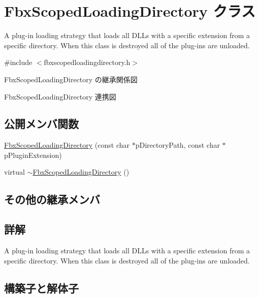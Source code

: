 \hypertarget{class_fbx_scoped_loading_directory}{}\section{Fbx\+Scoped\+Loading\+Directory クラス}
\label{class_fbx_scoped_loading_directory}


A plug-\/in loading strategy that loads all D\+L\+Ls with a specific extension from a specific directory. When this class is destroyed all of the plug-\/ins are unloaded.  




{\ttfamily \#include $<$fbxscopedloadingdirectory.\+h$>$}



Fbx\+Scoped\+Loading\+Directory の継承関係図


Fbx\+Scoped\+Loading\+Directory 連携図
\subsection*{公開メンバ関数}
\begin{DoxyCompactItemize}
\item 
\hyperlink{class_fbx_scoped_loading_directory_a9679c872ae08e0a76f9b63a7dc899985}{Fbx\+Scoped\+Loading\+Directory} (const char $\ast$p\+Directory\+Path, const char $\ast$p\+Plugin\+Extension)
\item 
virtual \hyperlink{class_fbx_scoped_loading_directory_ae8a3e3331bf58edef910021442af358b}{$\sim$\+Fbx\+Scoped\+Loading\+Directory} ()
\end{DoxyCompactItemize}
\subsection*{その他の継承メンバ}


\subsection{詳解}
A plug-\/in loading strategy that loads all D\+L\+Ls with a specific extension from a specific directory. When this class is destroyed all of the plug-\/ins are unloaded. 

\subsection{構築子と解体子}
\mbox{\label{class_fbx_scoped_loading_directory_a9679c872ae08e0a76f9b63a7dc899985}} 
